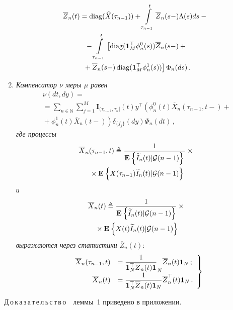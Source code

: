 \begin{multicols}{2}
\begin{enumerate}
\noindent
 \begin{multline}
  \!\!\overline{Z}_n(t)=\mathop{\mathrm{diag}}(\widehat{X}(\tau_{n-1}))
 + \int\limits_{\tau_{n-1}}^t \overline{Z}_n (s-)\Lambda(s)ds
 -{}\\
 {} -\int\limits_{\tau_{n-1}}^t
 \left[\mathop{\mathrm{diag}}(\mathbf{1}^{\top}_M\phi^{0}_n(s))
 \overline{Z}_n (s-)+{}\right.\\
\left. {}+\overline{Z}_n (s-)\mathop{\mathrm{diag}}(\mathbf{1}^{\top}_M\phi^{1}_n(s))
 \right]\Phi_n(ds)\,.
 \label{eq:Z_sys}
 \end{multline}
 \item
\textit{ Компенсатор $\nu$ меры $\mu$ равен}
 \begin{multline}
 \nu(dt,dy) = \\
 =\sum\limits_{n \in \mathbb{N}} \sum\limits_{j=1}^M
 \mathbf{I}_{(\tau_{n-1},\tau_n]}(t) y^{\top}\left(\phi^0_{n}(t)
 \overline{X}_n(\tau_{n-1},t-)+{}\right.\\
\left. {}+\phi^1_{n}(t)\overline{X}_n(t-)
 \right)\delta_{\{f_j\}}(dy)\Phi_n(dt)\,,
 \label{eq:nu}
 \end{multline}
 \textit{где процессы}
 \begin{multline}
  \overline{X}_n(\tau_{n-1},t) \triangleq \displaystyle\frac{\displaystyle 1\mathstrut}{\displaystyle 
\mathbf{E}_{  }\left\{ \mathop{\widetilde{I}_n(t)|{\mathcal G}(n-1)} \right\}\mathstrut}
\times{}\\
{}\times\mathbf{E}_{  }\left\{ \mathop{X(\tau_{n-1})\widetilde{I}_n(t)|{\mathcal G}(n-1)} \right\}
\label{eq:X_0_bar_0}
 \end{multline}
 \textit{и}
 \begin{multline}
 \overline{X}_n(t) \triangleq \frac{1}{
\mathbf{E}_{  }\left\{ \mathop{\widetilde{I}_n(t)|{\mathcal G}(n-1)} \right\}
}\times{}\\
{}\times \mathbf{E}_{  }\left\{ \mathop{X(t)\widetilde{I}_n(t)|{\mathcal G}(n-1)} \right\}
\label{eq:Xbar_0}
 \end{multline}
\textit{выражаются через статистики} $\overline{Z}_n(t)$:
 \begin{equation}
 \left.
 \begin{array}{rl}
 \overline{X}_n(\tau_{n-1},t) &=
\displaystyle\frac{\displaystyle 1\mathstrut}{\displaystyle \mathbf{1}_N^{\top}\overline{Z}_n(t)\mathbf{1}\mathstrut}_N\overline{Z}_n(t)\mathbf{1}_N\,;
\\[6pt]
 \overline{X}_n(t) &=
\displaystyle\frac{\displaystyle 1\mathstrut}{\displaystyle \mathbf{1}_N^{\top}\overline{Z}_n(t)\mathbf{1}_N\mathstrut}\overline{Z}^{\top}_n(t)\mathbf{1}_N\,.
\end{array}
\right\}
\label{eq:Xbar}
 \end{equation}
 \end{enumerate}

\medskip

\noindent
 Д\,о\,к\,а\,з\,а\,т\,е\,л\,ь\,с\,т\,в\,о\ \ леммы~1 приведено в приложении.


\end{multicols}
